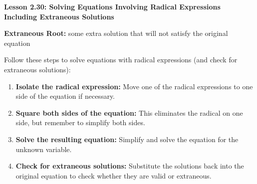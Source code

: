 \begin{center}
\textbf{Lesson 2.30: Solving Equations Involving Radical Expressions Including Extraneous Solutions}
\end{center}

\vspace*{1ex}

\noindent \textbf{Extraneous Root:} some extra solution that will not satisfy the original equation

\noindent Follow these steps to solve equations with radical expressions (and check for extraneous solutions):

\begin{enumerate}
    \item \textbf{Isolate the radical expression:} Move one of the radical expressions to one side of the equation if necessary.    
    \item \textbf{Square both sides of the equation:} This eliminates the radical on one side, but remember to simplify both sides.    
    \item \textbf{Solve the resulting equation:} Simplify and solve the equation for the unknown variable.
    \item \textbf{Check for extraneous solutions:} Substitute the solutions back into the original equation to check whether they are valid or extraneous.
    \end{enumerate}
    

